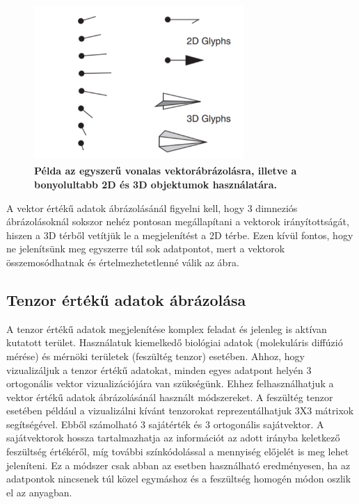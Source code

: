 \documentclass[12pt]{article}
\theoremstyle{plain}
\begin{document}
\begin{figure}[H]
   \centering
   \includegraphics[width=8cm, height=6cm]{media/glyph.PNG}
   \caption{\textbf{Példa az egyszerű vonalas vektorábrázolásra, illetve a bonyolultabb 2D és 3D objektumok használatára.}}
   \label{fig:GeneralDiagram}
\end{figure}

A vektor értékű adatok ábrázolásánál figyelni kell, hogy 3 dimneziós ábrázolásoknál sokszor nehéz pontosan megállapítani a vektorok irányítottságát, hiszen a 3D térből vetítjük le a megjelenítést a 2D térbe. Ezen kívül fontos, hogy ne jelenítsünk meg egyszerre túl sok adatpontot, mert a vektorok összemosódhatnak és értelmezhetetlenné válik az ábra. 

\subsection{Tenzor értékű adatok ábrázolása}
A tenzor értékű adatok megjelenítése komplex feladat és jelenleg is aktívan kutatott terület. Használatuk kiemelkedő biológiai adatok (molekuláris diffúzió mérése) és mérnöki területek (feszültég tenzor) esetében. Ahhoz, hogy vizualizáljuk a tenzor értékű adatokat, minden egyes adatpont helyén 3 ortogonális vektor vizualizációjára van szükségünk. Ehhez felhasználhatjuk a vektor értékű adatok ábrázolásánál használt módszereket. 
A feszültég tenzor esetében például a vizualizálni kívánt tenzorokat reprezentálhatjuk 3X3 mátrixok segítségével. Ebből számolható 3 sajátérték és 3 ortogonális sajátvektor. A sajátvektorok hossza tartalmazhatja az információt az adott irányba keletkező feszültség értékéről, míg további színkódolással a mennyiség előjelét is meg lehet jeleníteni. Ez a módszer csak abban az esetben használható eredményesen, ha az adatpontok nincsenek túl közel egymáshoz és a feszültség homogén módon oszlik el az anyagban. 
\end{document}
